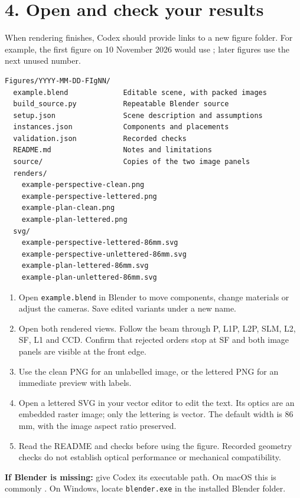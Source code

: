 \documentclass[11pt,a4paper]{article}
\begin{document}
\section*{4. Open and check your results}
When rendering finishes, Codex should provide links to a new figure folder. For example, the first figure on 10 November 2026 would use ; later figures use the next unused number.
\begin{Verbatim}[fontsize=\small]
Figures/YYYY-MM-DD-FIgNN/
  example.blend             Editable scene, with packed images
  build_source.py           Repeatable Blender source
  setup.json                Scene description and assumptions
  instances.json            Components and placements
  validation.json           Recorded checks
  README.md                 Notes and limitations
  source/                   Copies of the two image panels
  renders/
    example-perspective-clean.png
    example-perspective-lettered.png
    example-plan-clean.png
    example-plan-lettered.png
  svg/
    example-perspective-lettered-86mm.svg
    example-perspective-unlettered-86mm.svg
    example-plan-lettered-86mm.svg
    example-plan-unlettered-86mm.svg
\end{Verbatim}
\begin{enumerate}
\item Open \texttt{example.blend} in Blender to move components, change materials or adjust the cameras. Save edited variants under a new name.
\item Open both rendered views. Follow the beam through P, L1P, L2P, SLM, L2, SF, L1 and CCD. Confirm that rejected orders stop at SF and both image panels are visible at the front edge.
\item Use the clean PNG for an unlabelled image, or the lettered PNG for an immediate preview with labels.
\item Open a lettered SVG in your vector editor to edit the text. Its optics are an embedded raster image; only the lettering is vector. The default width is 86 mm, with the image aspect ratio preserved.
\item Read the README and checks before using the figure. Recorded geometry checks do not establish optical performance or mechanical compatibility.
\end{enumerate}
\textbf{If Blender is missing:} give Codex its executable path. On macOS this is commonly . On Windows, locate \texttt{blender.exe} in the installed Blender folder.
\end{document}
